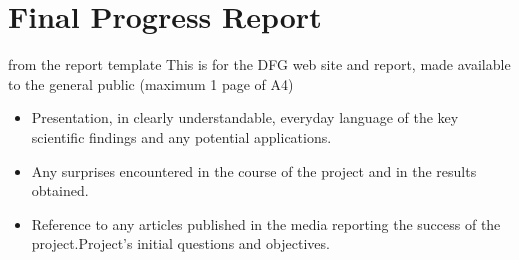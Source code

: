 \section{Final Progress Report}
\begin{todo}{from the report template}
  This is for the DFG web site and report, made available to the general public (maximum 1 page of A4)
  \begin{itemize}
  \item Presentation, in clearly understandable, everyday language of the key scientific
    findings and any potential applications.
  \item Any surprises encountered in the course of the project and in the results
    obtained.
  \item Reference to any articles published in the media reporting the success of the
    project.Project’s initial questions and objectives.
  \end{itemize}
\end{todo}

